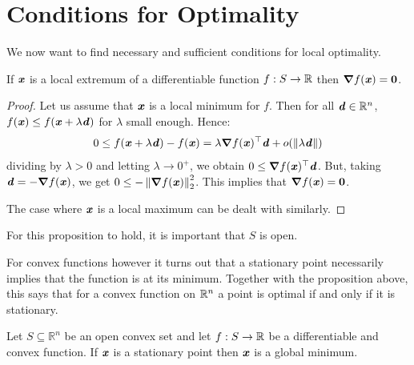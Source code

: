 \section{Conditions for Optimality}
We now want to find necessary and sufficient conditions for local
optimality.

\begin{proposition}
\label{prp:gradatmin}
    If $\boldsymbol{\mathit{x}}$ is a local extremum of a differentiable function
    $f:S\rightarrow \mathbb{R}$
    then $\boldsymbol{\nabla} f(\boldsymbol{\mathit{x}}) = \boldsymbol{0}$.
\end{proposition}

\begin{proof}
    Let us assume that $\boldsymbol{\mathit{x}}$ is a local minimum for $f$. Then for all $\boldsymbol{\mathit{d}}\in\mathbb{R}^n$, $f(\boldsymbol{\mathit{x}})\leq f(\boldsymbol{\mathit{x}}+\lambda \boldsymbol{\mathit{d}})$ for $\lambda$ small enough. Hence:
    \begin{displaymath}
        0\leq f(\boldsymbol{\mathit{x}}+\lambda \boldsymbol{\mathit{d}})-f(\boldsymbol{\mathit{x}}) = \lambda \boldsymbol{\nabla} f(\boldsymbol{\mathit{x}})^\top  \boldsymbol{\mathit{d}} +
        o(\|\lambda \boldsymbol{\mathit{d}}\|)
    \end{displaymath}
    dividing by $\lambda>0$ and letting $\lambda\rightarrow 0^+$, we
    obtain $0\leq \boldsymbol{\nabla} f(\boldsymbol{\mathit{x}})^\top  \boldsymbol{\mathit{d}}$.
    But, taking $\boldsymbol{\mathit{d}} = - \boldsymbol{\nabla} f(\boldsymbol{\mathit{x}}) $, we get $0\leq -\left\| \boldsymbol{\nabla} f(\boldsymbol{\mathit{x}}) \right\|_2^2$.
    This implies that $\boldsymbol{\nabla} f(\boldsymbol{\mathit{x}}) = \boldsymbol{0}$.

    The case where $\boldsymbol{\mathit{x}}$ is a local maximum can be dealt with similarly.
  \end{proof}
  \begin{remark}
    For this proposition to hold, it is important that $S$ is
    open.
  \end{remark}

For convex functions however it turns out that a stationary point
necessarily implies that the function is at its minimum.
Together with the proposition above, this says that for a convex function on
$\mathbb{R}^n$ a point is optimal if and only if it is stationary.

\begin{proposition}
Let $S \subseteq \mathbb{R}^n$ be an open convex set and let $f: S \to \mathbb{R}$ be a
differentiable and convex function.  If $\boldsymbol{\mathit{x}}$ is a stationary point then $\boldsymbol{\mathit{x}}$ is a global minimum.
\end{proposition}

